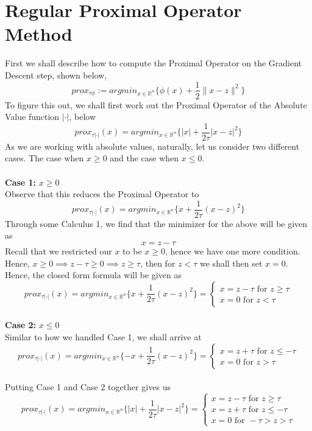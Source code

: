 \documentclass{article}
\renewcommand{\reals}{\mathbb{R}}
\begin{document}
\section{Regular Proximal Operator Method}
First we shall describe how to compute the Proximal Operator on the Gradient Descent step, shown below, 
$$
prox_{\tau \phi} := argmin_{x \in \reals^{n}} \{ \phi(x) + \frac{1}{2}\| x -z \|^{2} \}
$$
To figure this out, we shall first work out the Proximal Operator of the Absolute Value function $| \cdot |$, below
$$
prox_{\tau |\cdot|}(x) = argmin_{x \in \reals^{n}} \{ |x| + \frac{1}{2\tau}|x-z|^{2} \}
$$
As we are working with absolute values, naturally, let us consider two different cases. The case when $x \geq 0$ and the case when $x \leq 0$. \\
\ \\
\textbf{Case 1: } $x \geq 0$ \\
Observe that this reduces the Proximal Operator to
$$
prox_{\tau |\cdot|}(x) = argmin_{x \in \reals^{n}} \{ x + \frac{1}{2\tau}(x-z)^{2} \}
$$
Through some Calculus 1, we find that the minimizer for the above will be given as 
$$
x = z -\tau
$$
Recall that we restricted our $x$ to be $x \geq 0$, hence we have one more condition. \\
Hence, $x \geq 0 \implies z - \tau \geq 0 \implies z \geq \tau$, then for $z < \tau$ we shall then set $x = 0$. \\
Hence, the closed form formula will be given as
$$
prox_{\tau |\cdot|}(x) = argmin_{x \in \reals^{n}} \{ x + \frac{1}{2\tau}(x-z)^{2} \} = \left\{\begin{array}{l}
x = z - \tau \text{ for } z \geq \tau \\
x = 0 \text{ for } z < \tau
\end{array}\right.
$$
\ \\
\textbf{Case 2: } $x \leq 0$ \\
Similar to how we handled Case 1, we shall arrive at 
$$
prox_{\tau |\cdot|}(x) = argmin_{x \in \reals^{n}} \{ -x + \frac{1}{2\tau}(x-z)^{2} \} = 
\left\{\begin{array}{l}
x = z + \tau \text{ for } z \leq -\tau \\
x = 0 \text{ for } z > \tau
\end{array}\right.
$$
\ \\
\noindent
Putting Case 1 and Case 2 together gives us
$$
prox_{\tau |\cdot|}(x) = argmin_{x \in \reals^{n}} \{ |x| + \frac{1}{2\tau}|x-z|^{2} \} = 
\left\{\begin{array}{l}
x = z - \tau \text{ for } z \geq \tau \\
x = z + \tau \text{ for } z \leq -\tau \\
x = 0 \text{ for } -\tau > z > \tau
\end{array}\right.
$$
\end{document}
